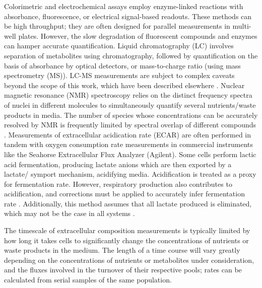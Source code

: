 \documentclass{compactarticle}
\begin{document}
Colorimetric and electrochemical assays employ enzyme-linked reactions with absorbance, fluorescence, or electrical signal-based readouts. These methods can be high throughput; they are often designed for parallel measurements in multi-well plates. However, the slow degradation of fluorescent compounds and enzymes can hamper accurate quantification.
Liquid chromatography (LC) involves separation of metabolites using chromatography, followed by quantification on the basis of absorbance by optical detectors, or mass-to-charge ratio (using mass spectrometry (MS)). LC-MS measurements are subject to complex caveats beyond the scope of this work, which have been described elsewhere \cite{lu2017metabolite}. Nuclear magnetic resonance (NMR) spectroscopy relies on the distinct frequency spectra of nuclei in different molecules to simultaneously quantify several nutrients/waste products in media. The number of species whose concentrations can be accurately resolved by NMR is frequently limited by spectral overlap of different compounds \cite{allen1997metabolite}.
Measurements of extracellular acidication rate (ECAR) are often performed in tandem with oxygen consumption rate measurements in commercial instruments like the Seahorse Extracellular Flux Analyzer (Agilent). Some cells perform lactic acid fermentation, producing lactate anions which are then exported by a lactate/ symport mechanism, acidifying media. Acidification is treated as a proxy for fermentation rate. However, respiratory  production also contributes to acidification, and corrections must be applied to accurately infer fermentation rate \cite{mookerjee2017quantifying}. Additionally, this method assumes that all lactate produced is eliminated, which may not be the case in all systems \cite{hui2017glucose,schmidt2021ocr}.

The timescale of extracellular composition measurements is typically limited by how long it takes cells to significantly change the concentrations of nutrients or waste products in the medium. The length of a time course will vary greatly depending on the concentrations of nutrients or metabolites under consideration, and the fluxes involved in the turnover of their respective pools; rates can be calculated from serial samples of the same population.
\end{document}
